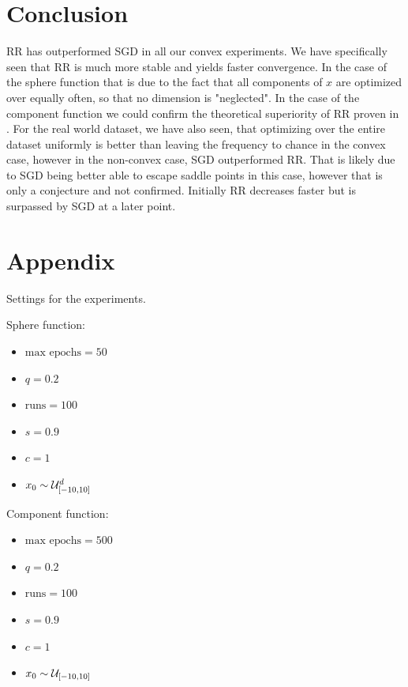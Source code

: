 \documentclass[10pt,conference,compsocconf]{IEEEtran}
\begin{document}
\section{Conclusion}

RR has outperformed SGD in all our convex experiments. We have specifically seen that RR is much more stable and yields faster convergence. In the case of the sphere function that is due to the fact that all components of $x$ are optimized over equally often, so that no dimension is "neglected". In the case of the component function we could confirm the theoretical superiority of RR proven in \cite{COMPONENTFUNCTION}. For the real world dataset, we have also seen, that optimizing over the entire dataset uniformly is better than leaving the frequency to chance in the convex case, however in the non-convex case, SGD outperformed RR. That is likely due to SGD being better able to escape saddle points in this case, however that is only a conjecture and not confirmed. Initially RR decreases faster but is surpassed by SGD at a later point. 

\section{Appendix}

\noindent Settings for the experiments.

\medskip

\noindent Sphere function:

\begin{itemize}
	\item $\text{max epochs} = 50$
	\item $q = 0.2$
	\item $ \text{runs} = 100$
	\item $s = 0.9$
	\item $c = 1$
	\item $x_0 \sim {\cal U}_{[-10, 10]}^d$
\end{itemize}

\medskip

\noindent Component function:

\begin{itemize}
	\item $ \text{max epochs} = 500$
	\item $q = 0.2$
	\item $ \text{runs} = 100$
	\item $s = 0.9$
	\item $c = 1$
	\item $x_0 \sim {\cal U}_{[-10, 10]}$
\end{itemize}
\end{document}
